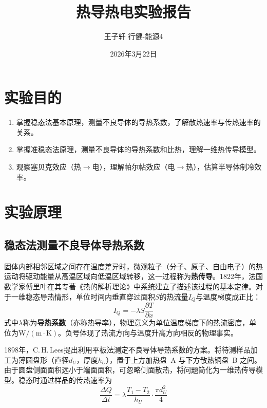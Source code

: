 \documentclass[UTF8]{article}
\title{热导热电实验报告}
\author{王子轩 \quad 行健-能源4 \quad 2024012848}
\date{2026年3月22日}
\begin{document}
\maketitle

\section{实验目的}
\begin{enumerate}
    \item 掌握稳态法基本原理，测量不良导体的导热系数，了解散热速率与传热速率的关系。
    \item 掌握准稳态法原理，测量不良导体的导热系数和比热，理解一维热传导模型。
    \item 观察塞贝克效应（热$\to$电），理解帕尔帖效应（电$\to$热），估算半导体制冷效率。
\end{enumerate}

\section{实验原理}

\subsection{稳态法测量不良导体导热系数}

固体内部相邻区域之间存在温度差异时，微观粒子（分子、原子、自由电子）的热运动将驱动能量从高温区域向低温区域转移，这一过程称为\textbf{热传导}。1822年，法国数学家傅里叶在其专著《热的解析理论》中系统建立了描述该过程的基本定律。对于一维稳态导热情形，单位时间内垂直穿过面积$S$的热流量$I_Q$与温度梯度成正比：
\begin{equation}\label{eq:fourier}
    I_Q = -\lambda S \frac{\partial T}{\partial x}
\end{equation}
式中$\lambda$称为\textbf{导热系数}（亦称热导率），物理意义为单位温度梯度下的热流密度，单位为$\mathrm{W/(m\cdot K)}$。负号体现了热流方向与温度升高方向相反的物理事实。

1898年，C.\,H.\,Lees提出利用平板法测定不良导体导热系数的方案。将待测样品加工为薄圆盘形（直径$d_U$，厚度$h_U$），置于上方加热盘~A 与下方散热铜盘~B 之间。由于圆盘侧面面积远小于端面面积，可忽略侧面散热，将问题简化为一维热传导模型。稳态时通过样品的传热速率为
\begin{equation}
    \frac{\Delta Q}{\Delta t} = \lambda \frac{T_1 - T_2}{h_U} \cdot \frac{\pi d_U^2}{4}
\end{equation}
\end{document}
